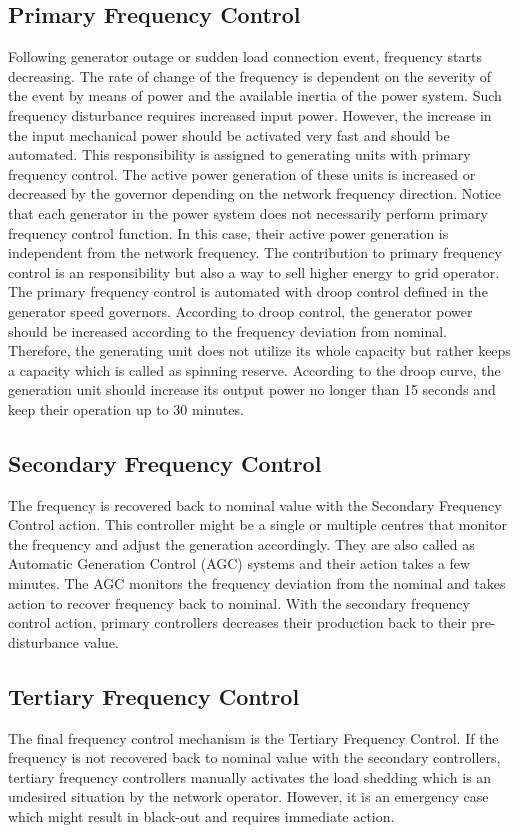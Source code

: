 \subsection{Primary Frequency Control}
Following generator outage or sudden load connection event, frequency starts decreasing. The rate of change of the frequency is dependent on the severity of the event by means of power and the available inertia of the power system. Such frequency disturbance requires increased input power. However, the increase in the input mechanical power should be activated very fast and should be automated. This responsibility is assigned to generating units with primary frequency control. The active power generation of these units is increased or decreased by the governor depending on the network frequency direction. Notice that each generator in the power system does not necessarily perform primary frequency control function. In this case, their active power generation is independent from the network frequency. The contribution to primary frequency control is an responsibility but also a way to sell higher energy to grid operator.
The primary frequency control is automated with droop control defined in the generator speed governors. According to droop control, the generator power should be increased according to the frequency deviation from nominal. Therefore, the generating unit does not utilize its whole capacity but rather keeps a capacity which is called as spinning reserve. According to the droop curve, the generation unit should increase its output power no longer than 15 seconds and keep their operation up to 30 minutes\cite{Machowski2011}.
\subsection{Secondary Frequency Control}
The frequency is recovered back to nominal value with the Secondary Frequency Control action. This controller might be a single or multiple centres that monitor the frequency and adjust the generation accordingly. They are also called as Automatic Generation Control (AGC) systems and their action takes a few minutes. The AGC monitors the frequency deviation from the nominal and takes action to recover frequency back to nominal. With the secondary frequency control action, primary controllers decreases their production back to their pre-disturbance value.
\subsection{Tertiary Frequency Control}
The final frequency control mechanism is the Tertiary Frequency Control. If the frequency is not recovered back to nominal value with the secondary controllers, tertiary frequency controllers manually activates the load shedding which is an undesired situation by the network operator. However, it is an emergency case which might result in black-out and requires immediate action.
